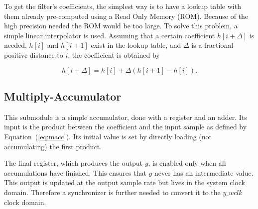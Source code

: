 To get the filter's coefficients, the simplest way is to have a lookup table
with them already pre-computed using a Read Only Memory (ROM).  Because
of the high precision needed the ROM would be too large.  To solve this problem,
a simple linear interpolator is used. Assuming that a certain coefficient
$h[i+\Delta]$ is needed, $h[i]$ and $h[i+1]$ exist in the lookup table, and
$\Delta$ is a fractional positive distance to $i$, the coefficient is obtained
by

\begin{equation}
  h[i+\Delta] = h[i] + \Delta (h[i+1]-h[i]).
  \label{eq:coeff_interpol}
\end{equation}

\subsection{Multiply-Accumulator}
\label{subsection:macc}

This submodule is a simple accumulator, done with a register and an adder. Its
input is the product between the coefficient and the input sample as defined by
Equation~(\ref{eq:macc}). Its initial value is set by directly loading (not
accumulating) the first product.

The final register, which produces the output $y$, is enabled only when all
accumulations have finished. This ensures that $y$ never has an intermediate
value. This output is updated at the output sample rate but lives in the system
clock domain. Therefore a synchronizer is further needed to convert it to the
$y\_wclk$ clock domain.
